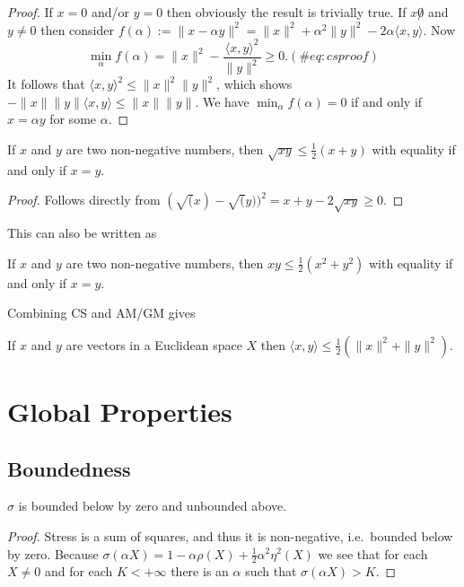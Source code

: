 \documentclass[
  12pt,
  letterpaper,
  DIV=11,
  numbers=noendperiod]{scrreprt}
\theoremstyle{remark}
\begin{document}
\begin{proof}
If \(x=0\) and/or \(y=0\) then obviously the result is trivially true.
If \(x\not 0\) and \(y\not= 0\) then consider
\(f(\alpha):=\|x-\alpha y\|^2=\|x\|^2+\alpha^2\|y\|^2-2\alpha\langle x,y\rangle\).
Now \begin{equation}
\min_\alpha f(\alpha)=\|x\|^2-\frac{\langle x,y\rangle^2}{\|y\|^2}\geq 0.
(\#eq:csproof)
\end{equation} It follows that
\(\langle x,y\rangle^2\leq\|x\|^2\|y\|^2\), which shows
\(-\|x\|\|y\|\langle x,y\rangle\leq\|x\|\|y\|\). We have
\(\min_\alpha f(\alpha)=0\) if and only if \(x=\alpha y\) for some
\(\alpha\).
\end{proof}

\label{amgm}
If \(x\) and \(y\) are two non-negative numbers, then
\(\sqrt{xy}\leq\frac12(x+y)\) with equality if and only if \(x=y\).

\begin{proof}
Follows directly from \((\sqrt(x)-\sqrt(y))^2=x+y-2\sqrt{xy}\geq 0\).
\end{proof}

This can also be written as

\label{amgm2}
If \(x\) and \(y\) are two non-negative numbers, then
\(xy\leq\frac12(x^2+y^2)\) with equality if and only if \(x=y\).

Combining CS and AM/GM gives

\label{amgmcs}
If \(x\) and \(y\) are vectors in a Euclidean space \(X\) then
\(\langle x,y\rangle\leq\frac12(\|x\|^2+\|y\|^2)\).

\section{Global Properties}\label{propglobal}

\subsection{Boundedness}\label{propbounded}

\label{stressbounded}
\(\sigma\) is bounded below by zero and unbounded above.

\begin{proof}
Stress is a sum of squares, and thus it is non-negative, i.e.~bounded
below by zero. Because
\(\sigma(\alpha X)=1-\alpha\rho(X)+\frac12\alpha^2\eta^2(X)\) we see
that for each \(X\not= 0\) and for each \(K<+\infty\) there is an
\(\alpha\) such that \(\sigma(\alpha X)>K\).
\end{proof}
\end{document}
